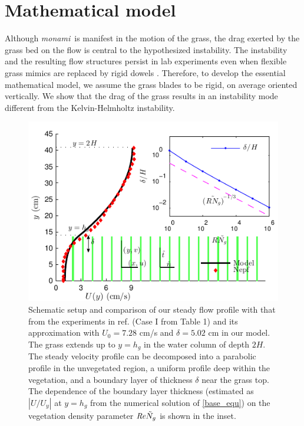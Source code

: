 \documentclass{jfm}
\newcommand{\hg}{h_g}
\newcommand{\Ndg}{\tilde{N}_g}
\newcommand{\monami}{\textit{monami}}
\newcommand{\ReyNdg}{{\Rey\Ndg}}
\begin{document}
\section{Mathematical model}
Although \monami ~is manifest in the motion of the grass, the drag exerted by the grass bed on the flow is central to the hypothesized instability. 
The instability and the resulting flow structures persist in lab experiments even when flexible grass mimics are replaced by rigid dowels \cite{Ghisal02,Nepf06}. 
Therefore, to develop the essential mathematical model, we assume the grass blades to be rigid, on average oriented vertically.
We show that the drag of the grass results in an instability mode different from the Kelvin-Helmholtz instability.
\begin{figure}
\centerline{\includegraphics[scale=1]{Grass_Base_Nepf_shear}}
\caption{
Schematic setup and comparison of our steady flow profile with that from the experiments in ref. \cite{Nepf04} (Case I from Table 1) %
 and its approximation with $U_0=7.28$ cm/s and $\delta = 5.02$ cm in our model. The grass extends up to $y=\hg$ in the water column of depth $2H$. 
The steady velocity profile can be decomposed into a parabolic profile in the unvegetated region, a uniform profile deep within the vegetation, and a boundary layer of thickness $\delta$ near the grass top. 
The dependence of the boundary layer thickness (estimated as $|U/U_y|$ at $y=\hg$ from the numerical solution of \eqref{base_equ}) on the vegetation density parameter $\ReyNdg$ is shown in the inset.
}
\label{basicflow}
\end{figure}
\end{document}
